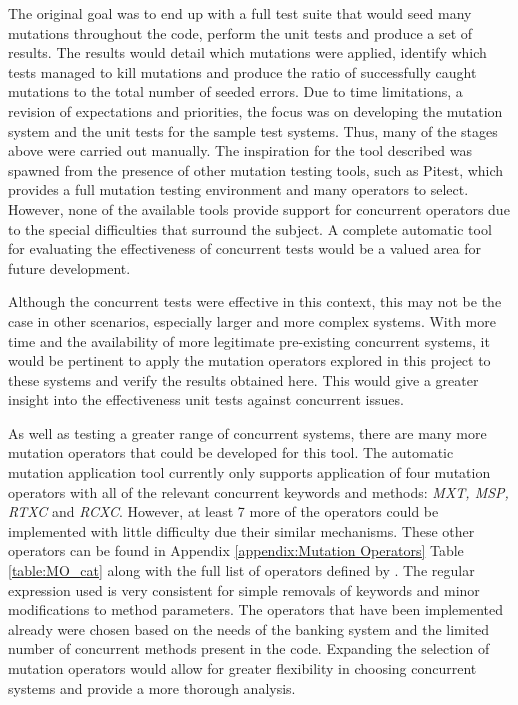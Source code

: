 \documentclass[a4paper,12pt]{article}
\begin{document}
The original goal was to end up with a full test suite that would seed many mutations throughout the code, perform the unit tests and produce a set of results. The results would detail which mutations were applied, identify which tests managed to kill mutations and produce the ratio of successfully caught mutations to the total number of seeded errors. Due to time limitations, a revision of expectations and priorities, the focus was on developing the mutation system and the unit tests for the sample test systems. Thus, many of the stages above were carried out manually. The inspiration for the tool described was spawned from the presence of other mutation testing tools, such as Pitest, which provides a full mutation testing environment and many operators to select. However, none of the available tools provide support for concurrent operators due to the special difficulties that surround the subject. A complete automatic tool for evaluating the effectiveness of concurrent tests would be a valued area for future development.

Although the concurrent tests were effective in this context, this may not be the case in other scenarios, especially larger and more complex systems. With more time and the availability of more legitimate pre-existing concurrent systems, it would be pertinent to apply the mutation operators explored in this project to these systems and verify the results obtained here. This would give a greater insight into the effectiveness unit tests against concurrent issues.  

As well as testing a greater range of concurrent systems, there are many more mutation operators that could be developed for this tool. The automatic mutation application tool currently only supports application of four mutation operators with all of the relevant concurrent keywords and methods: \textit{MXT, MSP, RTXC} and \textit{RCXC}. However, at least 7 more of the operators could be implemented with little difficulty due their similar mechanisms. These other operators can be found in Appendix \ref{appendix:Mutation Operators} Table \ref{table:MO_cat} along with the full list of operators defined by \citet{bradbury06}. The regular expression used is very consistent for simple removals of keywords and minor modifications to method parameters. The operators that have been implemented already were chosen based on the needs of the banking system and the limited number of concurrent methods present in the code. Expanding the selection of mutation operators would allow for greater flexibility in choosing concurrent systems and provide a more thorough analysis.      
\end{document}
